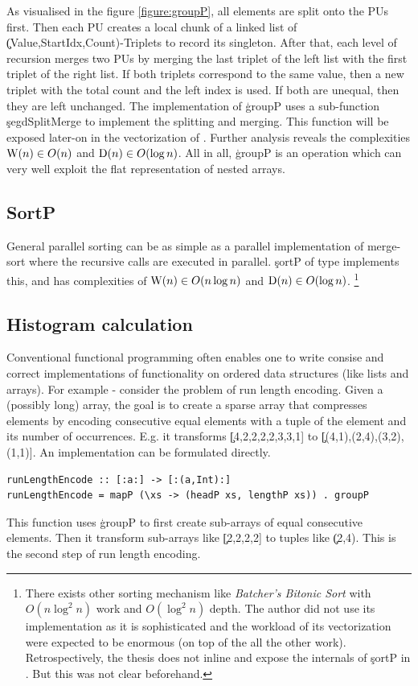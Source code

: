     As visualised in the figure \ref{figure:groupP},
    all elements are split onto the PUs first.
    Then each PU creates a local chunk of a linked list of
    \c{(Value,StartIdx,Count)}-Triplets to record its singleton.
    After that, each level of recursion merges two PUs by
    merging the last triplet of the left list with the first triplet
    of the right list. If both triplets correspond to the same value,
    then a new triplet with the total count and the left index is used.
    If both are unequal, then they are left unchanged. The implementation
    of \c{groupP} uses a sub-function \c{segdSplitMerge} to implement the
    splitting and merging. This function will be exposed later-on in
    the vectorization of \ndpn.
    Further analysis reveals the complexities $\textrm{W}(n) \in O(n)$ and $\textrm{D}(n) \in O(\log n)$.
    All in all, \c{groupP} is an operation which can very well exploit the flat representation of nested arrays.
    
  \subsection*{SortP}
    General parallel sorting can be as simple as a parallel
    implementation of merge-sort where the recursive calls are executed
    in parallel. \c{sortP} of type \type{[:Int:] -> [:Int:]} implements this,
    and has complexities of $\textrm{W}(n) \in O(n \log n)$
    and $\textrm{D}(n) \in O(\log n)$.
    \footnote{There exists other sorting mechanism
    like \emph{Batcher's Bitonic Sort} with $O(n \log^2 n)$ work and $O(\log^2 n)$
    depth. The author did not use its implementation as it is sophisticated and
    the workload of its vectorization were expected to be enormous (on top of the all the other work).
    Retrospectively, the thesis does not inline and expose the internals of \c{sortP} in \ndpv.
    But this was not clear beforehand.
    }

  \subsection*{Histogram calculation}
    Conventional functional programming often enables one to write
    consise and correct implementations of functionality on ordered
    data structures (like lists and arrays). For example -
    consider the problem of run length encoding. Given a (possibly long) array,
    the goal is to create a sparse array that compresses elements
    by encoding consecutive equal elements
    with a tuple of the element and its number of occurrences.
    E.g. it transforms \c{[4,2,2,2,2,3,3,1]} to \c{[(4,1),(2,4),(3,2),(1,1)]}.
    An implementation can be formulated directly.
    \begin{lstlisting}
runLengthEncode :: [:a:] -> [:(a,Int):]
runLengthEncode = mapP (\xs -> (headP xs, lengthP xs)) . groupP
    \end{lstlisting}
    This function uses \c{groupP} to first create sub-arrays of
    equal consecutive elements. Then it
    transform sub-arrays like \c{[2,2,2,2]} to tuples like \c{(2,4)}.
    This is the second step of run length encoding.
    
